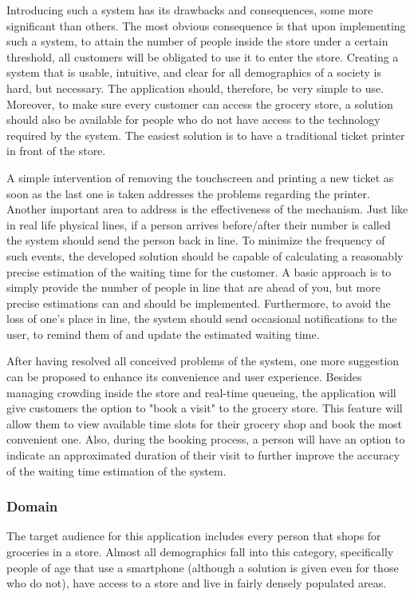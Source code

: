 Introducing such a system has its drawbacks and consequences, some more significant than others. The most obvious consequence is that upon implementing such a system, to attain the number of people inside the store under a certain threshold, all customers will be obligated to use it to enter the store. Creating a system that is usable, intuitive, and clear for all demographics of a society is hard, but necessary. The application should, therefore, be very simple to use. Moreover, to make sure every customer can access the grocery store, a solution should also be available for people who do not have access to the technology required by the system. The easiest solution is to have a traditional ticket printer in front of the store. 

A simple intervention of removing the touchscreen and printing a new ticket as soon as the last one is taken addresses the problems regarding the printer. Another important area to address is the effectiveness of the mechanism. Just like in real life physical lines, if a person arrives before/after their number is called the system should send the person back in line. To minimize the frequency of such events, the developed solution should be capable of calculating a reasonably precise estimation of the waiting time for the customer. A basic approach is to simply provide the number of people in line that are ahead of you, but more precise estimations can and should be implemented. Furthermore, to avoid the loss of one’s place in line, the system should send occasional notifications to the user, to remind them of and update the estimated waiting time. 

After having resolved all conceived problems of the system, one more suggestion can be proposed to enhance its convenience and user experience. Besides managing crowding inside the store and real-time queueing, the application will give customers the option to "book a visit" to the grocery store. This feature will allow them to view available time slots for their grocery shop and book the most convenient one. Also, during the booking process, a person will have an option to indicate an approximated duration of their visit to further improve the accuracy of the waiting time estimation of the system. 
\subsubsection{Domain}
\hspace{\parindent}The target audience for this application includes every person that shops for groceries in a store. Almost all demographics fall into this category, specifically people of age that use a smartphone (although a solution is given even for those who do not), have access to a store and live in fairly densely populated areas.
  
